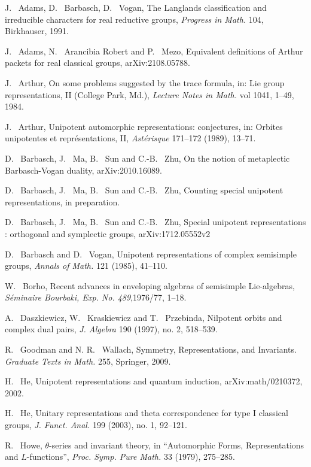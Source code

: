 \documentclass[lang = american]{ems-icm} %
\numberwithin{equation}{section}
\theoremstyle{remark}
\begin{document}
\begin{thebibliography}{99}


J. ~Adams, D. ~Barbasch, D. ~Vogan, The Langlands classification and irreducible characters for real reductive groups, \emph{Progress in Math.} 104, Birkh{a}user, 1991.

J. ~Adams, N. ~Arancibia Robert and P. ~Mezo,
Equivalent definitions of Arthur packets for real classical groups, arXiv:2108.05788.

J. ~Arthur, On some problems suggested by the trace formula, in: Lie group representations, II (College Park, Md.),  \emph{ Lecture Notes in Math.} vol 1041, 1--49, 1984.

J. ~Arthur, Unipotent automorphic representations: conjectures, in: Orbites unipotentes et repr\'esentations, II, \emph{Ast\'erisque} 171--172 (1989), 13--71.

D. ~Barbasch, J. ~Ma, B. ~Sun and C.-B. ~Zhu, On the notion of metaplectic Barbasch-Vogan duality, arXiv:2010.16089.

D. ~Barbasch, J. ~Ma, B. ~Sun and C.-B. ~Zhu, Counting special unipotent representations, in preparation.

D. ~Barbasch, J. ~Ma, B. ~Sun and C.-B. ~Zhu, Special unipotent representations : orthogonal and symplectic groups, arXiv:1712.05552v2

 D. ~Barbasch and D. ~Vogan, Unipotent representations of complex semisimple groups, \emph{Annals of Math.} 121 (1985), 41--110.

W. ~Borho, Recent advances in enveloping algebras of semisimple Lie-algebras, \emph{S\'eminaire Bourbaki, Exp. No. 489},1976/77, 1--18.

A. ~Daszkiewicz, W. ~Kraskiewicz and T. ~Przebinda, Nilpotent orbits and complex dual pairs, \emph{J. Algebra} 190 (1997), no. 2, 518--539.

R. ~Goodman and N. R. ~Wallach, Symmetry, Representations, and Invariants. \emph{Graduate Texts in Math.} 255, Springer, 2009.

H. ~He,
Unipotent representations and quantum induction,
arXiv:math/0210372, 2002.

H. ~He,
Unitary representations and theta correspondence for type I classical groups,
\emph{J. Funct. Anal.} 199 (2003), no. 1, 92--121.

R. ~Howe, $\theta$-series and invariant theory, in
``Automorphic Forms, Representations and $L$-functions'', \emph{Proc. Symp.
Pure Math.} 33 (1979), 275--285.


\end{thebibliography}
\end{document}
